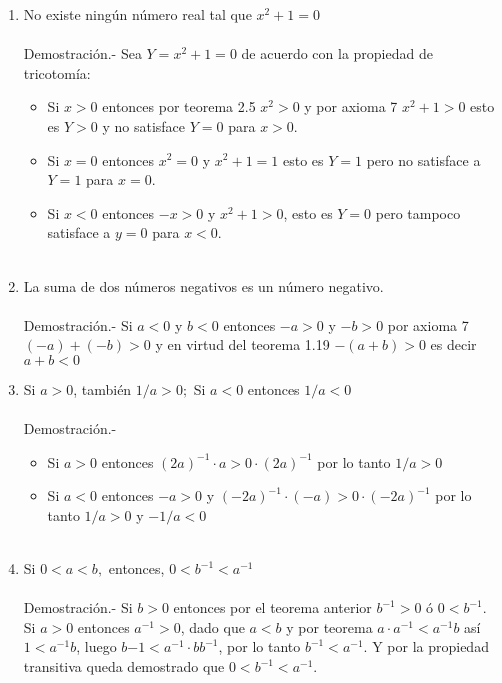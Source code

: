 \begin{enumerate}[\bfseries  1.]
\item No existe ningún número real tal que $x^2+1=0$\\\\
Demostración.- \; Sea $Y=x^2+1=0$ de acuerdo con la propiedad de tricotomía:
\begin{itemize}
\item Si $x>0$ entonces por teorema 2.5 \; $x^2>0$ y por axioma 7 \; $x^2+1>0$ esto es $Y > 0$ y no satisface $Y=0$ para $x>0$.
\item Si $x=0$ entonces $x^2=0$ y $x^2+1=1$ esto es $Y=1$ pero no satisface a $Y=1$ para $x=0$.
\item Si $x<0$ entonces $-x>0$ y $x^2+1>0$, esto es $Y=0$ pero tampoco satisface a $y=0$ para $x<0$.\\\\ 
\end{itemize}

\item La suma de dos números negativos es un número negativo.\\\\
Demostración.- \;   Si $a<0$ y $b<0$ entonces $-a>0$ y $-b>0$ por axioma 7 \; $(-a)+(-b)>0$ y en virtud del teorema 1.19 \; $-(a+b)>0$ es decir $a+b<0$\\

\item Si $a>0$, también $1/a>0;$ Si $a<0$ entonces $1/a<0$\\\\
Demostración.- \;
\begin{itemize}
\item Si $a>0$ entonces $(2a)^{-1}\cdot a > 0 \cdot (2a)^{-1}$ por lo tanto $1/a>0$
\item Si $a<0$ entonces $-a>0$ y $(-2a)^{-1}\cdot (-a)>0\cdot (-2a)^{-1}$ por lo tanto $1/a>0$ y $-1/a<0$\\\\
\end{itemize}

\item 
Si $0<a<b,$ entonces, $0<b^{-1}<a^{-1}$\\\\
Demostración.- \; Si $b>0$ entonces por el teorema anterior  $b^{-1}>0$ ó $0<b^{-1}$.\\
Si $a>0$ entonces $a^{-1}>0$, dado que $a<b$ y por teorema  \; $a\cdot a^{-1}< a^{-1}b$ así $1<a^{-1}b$, luego $b{-1}<a^{-1}\cdot bb^{-1}$, por lo tanto $b^{-1}<a^{-1}$. Y por la propiedad transitiva queda demostrado que $0<b^{-1}<a^{-1}$.\\\\


\end{enumerate}
